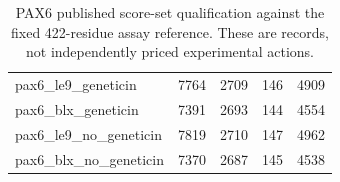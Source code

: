 \begin{table}[t]
\centering\small{}\setlength{\tabcolsep}{3.5pt}
\caption{PAX6 published score-set qualification against the fixed 422-residue assay reference. These are records, not independently priced experimental actions.}
\label{tab:pax6qualified}
\begin{tabularx}{\textwidth}{@{}XN{0.12\textwidth}N{0.17\textwidth}N{0.14\textwidth}N{0.13\textwidth}@{}}
\toprule
{} &  &  &  & \\\midrule
pax6\_le9\_geneticin & 7764 & 2709 & 146 & 4909\\
pax6\_blx\_geneticin & 7391 & 2693 & 144 & 4554\\
pax6\_le9\_no\_geneticin & 7819 & 2710 & 147 & 4962\\
pax6\_blx\_no\_geneticin & 7370 & 2687 & 145 & 4538\\
\bottomrule
\end{tabularx}
\end{table}
